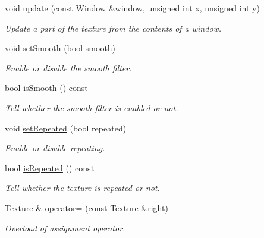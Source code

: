 \begin{DoxyCompactItemize}
void \hyperlink{classsf_1_1_texture_a154f246eb8059b602076009ab1cfd175}{update} (const \hyperlink{classsf_1_1_window}{Window} \&window, unsigned int x, unsigned int y)
\begin{DoxyCompactList}\small\item\em Update a part of the texture from the contents of a window. \end{DoxyCompactList}\item 
void \hyperlink{classsf_1_1_texture_a0c3bd6825b9a99714f10d44179d74324}{set\+Smooth} (bool smooth)
\begin{DoxyCompactList}\small\item\em Enable or disable the smooth filter. \end{DoxyCompactList}\item 
bool \hyperlink{classsf_1_1_texture_a1d6643d3c76f2be29dc401dc22749e16}{is\+Smooth} () const 
\begin{DoxyCompactList}\small\item\em Tell whether the smooth filter is enabled or not. \end{DoxyCompactList}\item 
void \hyperlink{classsf_1_1_texture_aaa87d1eff053b9d4d34a24c784a28658}{set\+Repeated} (bool repeated)
\begin{DoxyCompactList}\small\item\em Enable or disable repeating. \end{DoxyCompactList}\item 
bool \hyperlink{classsf_1_1_texture_a007a19b48952b7854120bf423c102150}{is\+Repeated} () const 
\begin{DoxyCompactList}\small\item\em Tell whether the texture is repeated or not. \end{DoxyCompactList}\item 
\hyperlink{classsf_1_1_texture}{Texture} \& \hyperlink{classsf_1_1_texture_a80a089b6b19bb09b83012d5f0e6af9ba}{operator=} (const \hyperlink{classsf_1_1_texture}{Texture} \&right)
\begin{DoxyCompactList}\small\item\em Overload of assignment operator. \end{DoxyCompactList}\end{DoxyCompactItemize}
